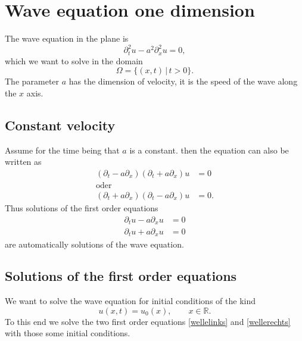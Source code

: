 %
%
%
\section{Wave equation one dimension}
The wave equation in the plane is
\[
\partial_t^2u-a^2\partial_x^2u=0,
\]
which we want to solve in the domain
\[
\Omega = \{(x,t) \,|\, t > 0\}.
\]
The parameter $a$ has the dimension of velocity, it is the
speed of the wave along the $x$ axis.

\subsection{Constant velocity}
Assume for the time being that $a$ is a constant.
then the equation can also be written as
\begin{align*}
(\partial_t -a\partial_x)(\partial_t+a\partial_x)u&=0
\\
\text{oder}&
\\
(\partial_t +a\partial_x)(\partial_t-a\partial_x)u&=0.
\end{align*}
Thus solutions of the first order equations
\begin{align}
\partial_t u-a\partial_x u&=0
\label{wellelinks}
\\
\partial_t u+a\partial_x u&=0
\label{wellerechts}
\end{align}
are automatically solutions of the wave equation.

\subsection{Solutions of the first order equations}
We want to solve the wave equation for initial conditions of the kind
\begin{equation}
u(x,t)=u_0(x),\qquad x\in\mathbb R.
\label{welleanfang}
\end{equation}
To this end we solve the two first order equations
\eqref{wellelinks} and \eqref{wellerechts} with
those some initial conditions.

